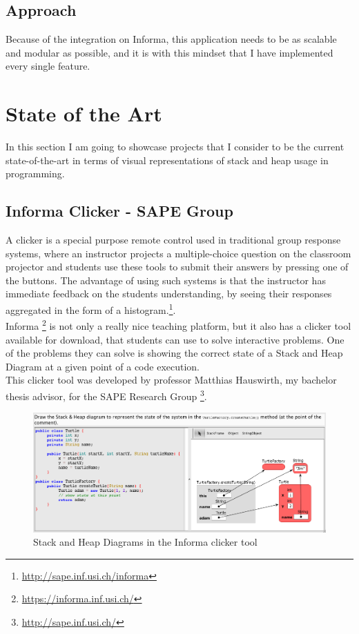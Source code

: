 \documentclass[]{usiinfbachelorproject}
\begin{document}
\subsection{Approach}

Because of the integration on Informa, this application needs to be as scalable and modular as possible, and it is with this mindset that I have implemented every single feature. 

\vspace{\fill}

\pagebreak

\section{State of the Art} \label{state}

In this section I am going to showcase projects that I consider to be the current state-of-the-art in terms of visual representations of stack and heap usage in programming.

\subsection{Informa Clicker - SAPE Group}

A clicker is a special purpose remote control used in traditional group response systems, where an instructor projects a multiple-choice question on the classroom projector and students use these tools to submit their answers by pressing one of the buttons. The advantage of using such systems is that the instructor has immediate feedback on the students understanding, by seeing their responses aggregated in the form of a histogram.\footnote{\url{http://sape.inf.usi.ch/informa}}.\\

\noindent Informa \footnote{\url{https://informa.inf.usi.ch/}} is not only a really nice teaching platform, but it also has a clicker tool available for download, that students can use to solve interactive problems. One of the problems they can solve is showing the correct state of a Stack and Heap Diagram at a given point of a code execution.\\

\noindent This clicker tool was developed by professor Matthias Hauswirth, my bachelor thesis advisor, for the SAPE Research Group \footnote{\url{http://sape.inf.usi.ch/}}.

\begin{figure}[h!]
\includegraphics[scale=0.4]{figures/informa_clicker.png}
\centering
\caption {Stack and Heap Diagrams in the Informa clicker tool}
\end{figure}
\end{document}
